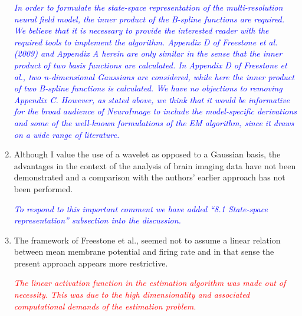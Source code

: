 \documentclass{article}
\newcommand{\dean}[1]{\textcolor{red}{#1}}
\newcommand{\parham}[1]{\textcolor{blue}{#1}}
\begin{document}
\begin{enumerate}
\emph{\parham{In order to formulate the state-space representation of the multi-resolution neural field model, the inner product of the B-spline functions are required. We believe that it is necessary to provide the interested reader with the required tools to implement the algorithm. Appendix D of Freestone et al. (2009) and Appendix A herein are only similar in the sense that the inner product of two basis functions are calculated. In Appendix D of Freestone et al., two  n-dimensional Gaussians are considered, while here the inner product of two B-spline functions is calculated. We have no objections to removing Appendix C. However, as stated above, we think that it would be informative for the broad audience of NeuroImage to include the model-specific derivations and some of the well-known formulations of the EM algorithm, since it draws on a wide range of literature.} }

        \item Although I value the use of a wavelet as opposed to a Gaussian basis, the advantages in the context of the analysis of brain imaging data have not been demonstrated and a comparison with the authors' earlier approach has not been performed.  

\emph{\parham{To respond to this important comment we have added ``8.1 State-space representation'' subsection into the discussion.}}

				\item{The framework of Freestone et al., seemed not to assume a linear relation between mean membrane potential and firing rate and in that sense the present approach appears more restrictive. }

\emph{\dean{The linear activation function in the estimation algorithm was made out of necessity. This was due to the high dimensionality and associated computational demands of the estimation problem.}}


\end{enumerate}
\end{document}
